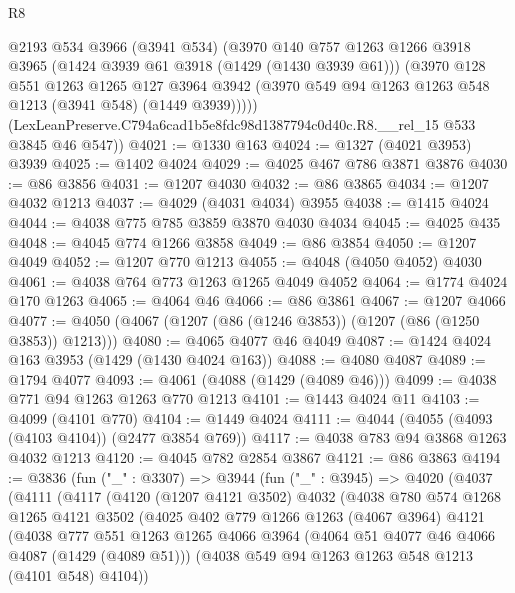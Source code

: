 \begin{lexlean}{R8}
\begin{coremodule}
        @2193
        @534
        @3966
        (@3941 @534)
        (@3970
          @140
          @757
          @1263
          @1266
          @3918
          @3965
          (@1424 @3939 @61 @3918 (@1429 (@1430 @3939 @61)))
          (@3970
            @128
            @551
            @1263
            @1265
            @127
            @3964
            @3942
            (@3970 @549 @94 @1263 @1263 @548 @1213 (@3941 @548) (@1449 @3939)))))
      (LexLeanPreserve.C794a6cad1b5e8fdc98d1387794c0d40c.R8.__rel_15 @533 @3845 @46 @547))
@4021 := @1330 @163
@4024 := @1327 (@4021 @3953) @3939
@4025 := @1402 @4024
@4029 := @4025 @467 @786 @3871 @3876
@4030 := @86 @3856
@4031 := @1207 @4030
@4032 := @86 @3865
@4034 := @1207 @4032 @1213
@4037 := @4029 (@4031 @4034) @3955
@4038 := @1415 @4024
@4044 := @4038 @775 @785 @3859 @3870 @4030 @4034
@4045 := @4025 @435
@4048 := @4045 @774 @1266 @3858
@4049 := @86 @3854
@4050 := @1207 @4049
@4052 := @1207 @770 @1213
@4055 := @4048 (@4050 @4052) @4030
@4061 := @4038 @764 @773 @1263 @1265 @4049 @4052
@4064 := @1774 @4024 @170 @1263
@4065 := @4064 @46
@4066 := @86 @3861
@4067 := @1207 @4066
@4077 := @4050 (@4067 (@1207 (@86 (@1246 @3853)) (@1207 (@86 (@1250 @3853)) @1213)))
@4080 := @4065 @4077 @46 @4049
@4087 := @1424 @4024 @163 @3953 (@1429 (@1430 @4024 @163))
@4088 := @4080 @4087
@4089 := @1794 @4077
@4093 := @4061 (@4088 (@1429 (@4089 @46)))
@4099 := @4038 @771 @94 @1263 @1263 @770 @1213
@4101 := @1443 @4024 @11
@4103 := @4099 (@4101 @770)
@4104 := @1449 @4024
@4111 := @4044 (@4055 (@4093 (@4103 @4104)) (@2477 @3854 @769))
@4117 := @4038 @783 @94 @3868 @1263 @4032 @1213
@4120 := @4045 @782 @2854 @3867
@4121 := @86 @3863
@4194 := @3836
    (fun ("_" : @3307) =>
    @3944
      (fun ("_" : @3945) =>
      @4020
        (@4037
          (@4111
            (@4117
              (@4120
                (@1207 @4121 @3502)
                @4032
                (@4038
                  @780
                  @574
                  @1268
                  @1265
                  @4121
                  @3502
                  (@4025
                    @402
                    @779
                    @1266
                    @1263
                    (@4067 @3964)
                    @4121
                    (@4038
                      @777
                      @551
                      @1263
                      @1265
                      @4066
                      @3964
                      (@4064 @51 @4077 @46 @4066 @4087 (@1429 (@4089 @51)))
                      (@4038 @549 @94 @1263 @1263 @548 @1213 (@4101 @548) @4104))

\end{coremodule}
\end{lexlean}
